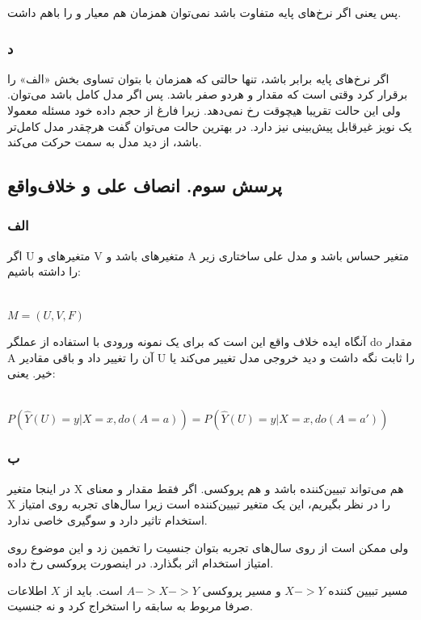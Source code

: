 پس یعنی اگر نرخ‌های پایه متفاوت باشد نمی‌توان همزمان هم معیار 
و
را باهم داشت.

\subsubsection{د}
اگر نرخ‌های پایه برابر باشد، تنها حالتی که همزمان با 
بتوان تساوی بخش «الف» را برقرار کرد وقتی است که مقدار
و
هردو صفر باشد. پس اگر مدل کامل باشد می‌توان. ولی این حالت تقریبا هیچوقت رخ نمی‌دهد. زیرا فارغ از حجم داده خود مسئله معمولا یک نویز غیرقابل پیش‌بینی نیز دارد. در بهترین حالت می‌توان گفت هرچقدر مدل کامل‌تر باشد، از دید 
مدل به سمت  حرکت می‌کند.
\subsection{پرسش سوم. انصاف علی و خلاف‌واقع}
\subsubsection{الف}
اگر U متغیرهای 
و
V 
متغیرهای 
باشد و A متغیر حساس باشد و مدل علی ساختاری زیر را داشته باشیم:

\begin{latin}
	~\\
	$
	M = (U, V, F)
	$
\end{latin}
آنگاه ایده خلاف واقع این است که برای یک نمونه ورودی با استفاده از عملگر do مقدار A آن را تغییر داد و باقی مقادیر U را ثابت نگه داشت و دید خروجی مدل تغییر می‌کند یا خیر. یعنی:

\begin{latin}
	~\\
	$
	P(\hat{Y}(U) = y | X = x, do(A = a)) =P(\hat{Y}(U) = y | X = x, do (A = a'))
	$
\end{latin}
\subsubsection{ب}
در اینجا متغیر
X
هم می‌تواند تبیین‌کننده باشد و هم پروکسی. اگر فقط مقدار و معنای X را در نظر بگیریم، این یک متغیر تبیین‌کننده است زیرا سال‌های تجربه روی امتیاز استخدام تاثیر دارد و سوگیری خاصی ندارد.

ولی ممکن است از روی سال‌های تجربه بتوان جنسیت را تخمین زد و این موضوع روی امتیاز استخدام اثر بگذارد. در اینصورت پروکسی رخ داده. 

مسیر تبیین کننده 
$X -> Y$
و مسیر پروکسی 
$A -> X -> Y$
است. باید از $X$ اطلاعات صرفا مربوط به سابقه را استخراج کرد و نه جنسیت.

